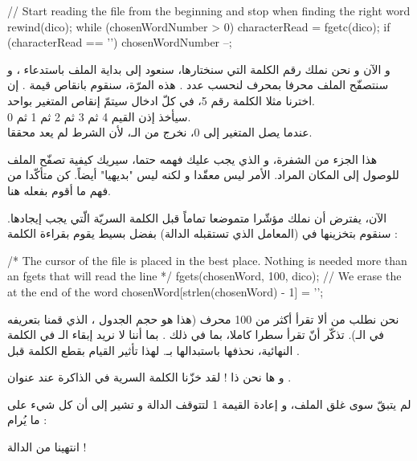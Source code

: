 \begin{Csource}
// Start reading the file from the beginning and stop when finding the right word
rewind(dico);
while (chosenWordNumber   > 0)
{
	characterRead = fgetc(dico);
	if (characterRead == '\n')
    	 chosenWordNumber --;
}
\end{Csource}

و الآن و نحن نملك رقم الكلمة التي سنختارها، سنعود إلى بداية الملف باستدعاء
،
و سنتصفّح الملف محرفا بمحرف لنحسب عدد
.
هذه المرّة، سنقوم بانقاص قيمة
.
إن اخترنا مثلا الكلمة رقم 5، في كلّ ادخال سيتمّ إنقاص المتغير
بواحد.\\
سيأخذ إذن القيم 4 ثم 3 ثم 2 ثم 1 ثم 0. \\
عندما يصل المتغير إلى 0، نخرج من الـ،
لأن الشرط
لم يعد محققا.

هذا الجزء من الشفرة، و الذي يجب عليك فهمه حتما، سيريك كيفية تصفّح الملف للوصول إلى المكان المراد. الأمر ليس معقّدا و لكنه ليس "بديهيا" أيضاً. كن متأكّدا من فهم ما أقوم بفعله هنا.

الآن، يفترض أن نملك مؤشّرا متموضعا تماماً قبل الكلمة السريّة الّتي يجب إيجادها.
سنقوم بتخزينها في
(المعامل الذي تستقبله الدالة) بفضل
بسيط يقوم بقراءة الكلمة :

\begin{Csource}
/* The cursor of the file is placed in the best place.
Nothing is needed more than an fgets that will read the line */
fgets(chosenWord, 100, dico);
// We erase the \n at the end of the word
chosenWord[strlen(chosenWord) - 1] = '\0';
\end{Csource}

نحن نطلب من
ألا تقرأ أكثر من 100 محرف (هذا هو حجم الجدول
،
الذي قمنا بتعريفه في الـ).
تذكّر أنّ
تقرأ سطرا كاملا، بما في ذلك
.
بما أننا لا نريد إبقاء الـ
في الكلمة النهائية، نحذفها باستبدالها بـ.
لهذا تأثير القيام بقطع الكلمة قبل
.

و ها نحن ذا ! لقد خزّنا الكلمة السرية في الذاكرة عند عنوان
.

لم يتبقّ سوى غلق الملف، و إعادة القيمة 1 لتتوقف الدالة و تشير إلى أن كل شيء على ما يُرام :

\begin{Csource}
  fclose(dico);
  return 1; // Everything is okay, return 1
}
\end{Csource}
انتهينا من الدالة
 !

